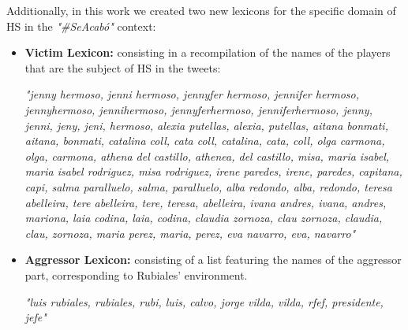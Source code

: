Additionally, in this work we created two new lexicons for the specific domain of HS in the \textit{"\#SeAcabó"} context:
\begin{itemize}
    \item \textbf{Victim Lexicon:} consisting in a recompilation of the names of the players that are the subject of HS in the tweets:
    
    \textit{"jenny hermoso,
            jenni hermoso,
            jennyfer hermoso,
            jennifer hermoso,
            jennyhermoso,
            jennihermoso,
            jennyferhermoso,
            jenniferhermoso,
            jenny,
            jenni,
            jeny,
            jeni,
            hermoso,
            alexia putellas,
            alexia,
            putellas,
            aitana bonmati,
            aitana,
            bonmati,
            catalina coll,
            cata coll,
            catalina,
            cata,
            coll,
            olga carmona,
            olga,
            carmona,
            athena del castillo,
            athenea,
            del castillo,
            misa,
            maria isabel,
            maria isabel rodriguez,
            misa rodriguez,
            irene paredes,
            irene,
            paredes,
            capitana,
            capi,
            salma paralluelo,
            salma,
            paralluelo,
            alba redondo,
            alba,
            redondo,
            teresa abelleira,
            tere abelleira,
            tere,
            teresa,
            abelleira,
            ivana andres,
            ivana,
            andres,
            mariona,
            laia codina,
            laia,
            codina,
            claudia zornoza,
            clau zornoza,
            claudia,
            clau,
            zornoza,
            maria perez,
            maria,
            perez,
            eva navarro,
            eva,
            navarro"}
    
    \item \textbf{Aggressor Lexicon:} consisting of a list featuring the names of the aggressor part, corresponding to Rubiales' environment.

    \textit{"luis rubiales,
            rubiales,
            rubi,
            luis,
            calvo,
            jorge vilda,
            vilda,
            rfef,
            presidente,
            jefe"}
\end{itemize}